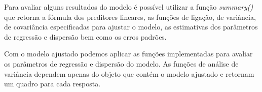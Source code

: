 \begin{knitrout}
\color{fgcolor}\begin{kframe}
\begin{alltt}
 \hlkwb{<-} \hlstd{(} \hlstd{=} 
                    \hlstd{=} \hlstd{(}
                    \hlstd{=} \hlstd{(}\hlstd{,}
                            \hlstd{,}
                            \hlstd{),}
                    \hlstd{=} \hlstd{(}\hlstd{,}
                                \hlstd{,}
                                \hlstd{),}
                    \hlstd{=} \hlstd{(}\hlstd{,}
                                 \hlstd{,}
                                 \hlopt{$}
                    \hlstd{=} 
                    
\end{alltt}
\end{kframe}
\end{knitrout}


Para avaliar alguns resultados do modelo é possível utilizar a função \emph{summary()} que retorna a fórmula dos preditores lineares, as funções de ligação, de variância, de covariância especificadas para ajustar o modelo, as estimativas dos parâmetros de regressão e dispersão bem como os erros padrões.

Com o modelo ajustado podemos aplicar as funções implementadas para avaliar os parâmetros de regressão e dispersão do modelo. As funções de análise de variância dependem apenas do objeto que contém o modelo ajustado e retornam um quadro para cada resposta.


